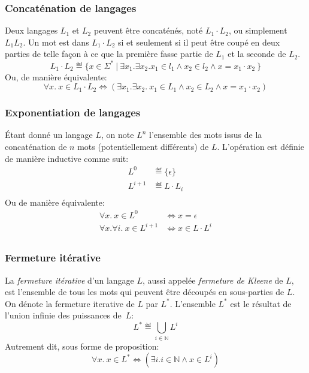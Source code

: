 \subsubsection{Concaténation de langages}

Deux langages $L_1$ et $L_2$ peuvent être concaténés, noté $L_1 \cdot L_2$, ou simplement $L_1L_2$.
Un mot est dans $L_1 \cdot L_2$ si et seulement si il peut être coupé en deux parties de telle façon à ce que la première fasse partie de $L_1$ et la seconde de $L_2$.
\[
L_1 \cdot L_2 \eqdef \{ x \in \Sigma^*\ |\ \exists x_1. \exists x_2. x_1 \in l_1 \wedge x_2 \in l_2 \wedge x = x_1 \cdot x_2\ \}
\]
Ou, de manière équivalente:
\[
\forall x.\ x \in L_1 \cdot L_2 \iff (\exists x_1. \exists x_2.\ x_1 \in L_1 \wedge x_2 \in L_2 \wedge x = x_1 \cdot x_2)
\]

\subsubsection{Exponentiation de langages}

Étant donné un langage $L$, on note $L^n$ l'ensemble des mots issus de la concaténation de $n$ mots (potentiellement différents) de $L$.
L'opération est définie de manière inductive comme suit:
\begin{align*}
L^0 &\eqdef \{ \epsilon \}\\
L^{i + 1} &\eqdef L \cdot L_i\\
\end{align*}
Ou de manière équivalente:
\begin{align*}
\forall x.\ x \in L^0 &\iff x = \epsilon\\
\forall x. \forall i.\ x \in L^{i + 1} &\iff x \in L \cdot L^i\\
\end{align*}

\subsubsection{Fermeture itérative}

La \og \textit{fermeture itérative} \fg{} d'un langage $L$, aussi appelée \og \textit{fermeture de Kleene} \fg{} de $L$, est l'ensemble de tous les mots qui peuvent être découpés en sous-parties de $L$. On dénote la fermeture iterative de $L$ par $L^*$.
L'ensemble $L^*$ est le résultat de l'union infinie des puissances de~$L$:
\[
L^* \eqdef \bigcup_{i \in \mathbb{N}} L^i
\]
Autrement dit, sous forme de proposition:
\[
\forall x.\ x \in L^* \iff (\exists i. i \in \mathbb{N} \wedge x \in L^i)
\]

